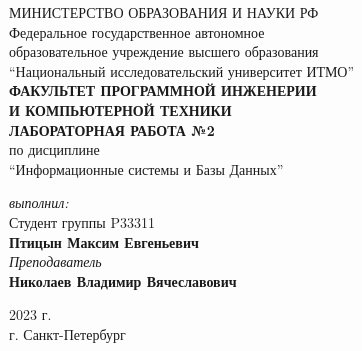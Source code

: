 
\begin{center}
	МИНИСТЕРСТВО ОБРАЗОВАНИЯ И НАУКИ РФ\\
	\hfill \break
	Федеральное государственное автономное\\
	образовательное учреждение высшего образования\\
	``Национальный исследовательский университет ИТМО''\\
	\hfill \break
	\textbf{ФАКУЛЬТЕТ ПРОГРАММНОЙ ИНЖЕНЕРИИ \\
	И КОМПЬЮТЕРНОЙ ТЕХНИКИ}\\
	\vspace{2cm}
	\large{\textbf{ЛАБОРАТОРНАЯ РАБОТА №2}}\\
	\hfill \break
	по дисциплине\\
		\large{``Информационные системы и Базы Данных''}\\
	\hfill \break
\end{center}
\begin{flushright}
	\vspace{3cm}
	\textit{выполнил:}\\
	Студент группы P33311\\
	\textbf{Птицын Максим Евгеньевич}\\
	\textit{Преподаватель}\\
	\textbf{Николаев Владимир Вячеславович}
\end{flushright}
\vspace{5cm}
\begin{center}
	2023 г.\\
	г. Санкт-Петербург
\end{center}
\thispagestyle{empty}
\newpage